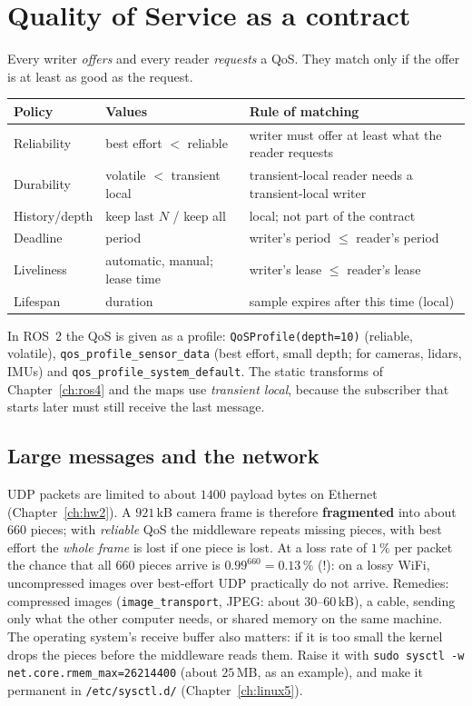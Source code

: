 \section*{Quality of Service as a contract}
Every writer \emph{offers} and every reader \emph{requests} a QoS. They match only if the offer is at least as good as the request.
\begin{center}
\renewcommand{\arraystretch}{1.25}
\begin{tabular}{p{2.6cm}p{4.2cm}p{5.8cm}}
\textbf{Policy} & \textbf{Values} & \textbf{Rule of matching}\\ \hline
Reliability & best effort $<$ reliable & writer must offer at least what the reader requests\\
Durability & volatile $<$ transient local & transient-local reader needs a transient-local writer\\
History/depth & keep last $N$ / keep all & local; not part of the contract\\
Deadline & period & writer's period $\le$ reader's period\\
Liveliness & automatic, manual; lease time & writer's lease $\le$ reader's lease\\
Lifespan & duration & sample expires after this time (local)\\
\end{tabular}
\end{center}
In ROS~2 the QoS is given as a profile: \verb!QoSProfile(depth=10)! (reliable, volatile), \verb!qos_profile_sensor_data! (best effort, small depth; for cameras, lidars, IMUs) and \verb!qos_profile_system_default!. The static transforms of Chapter~\ref{ch:ros4} and the maps use \emph{transient local}, because the subscriber that starts later must still receive the last message.

\subsection*{Large messages and the network}
UDP packets are limited to about $1400$ payload bytes on Ethernet (Chapter~\ref{ch:hw2}). A $921$\,kB camera frame is therefore \textbf{fragmented} into about $660$ pieces; with \emph{reliable} QoS the middleware repeats missing pieces, with best effort the \emph{whole frame} is lost if one piece is lost. At a loss rate of $1\,\%$ per packet the chance that all $660$ pieces arrive is $0.99^{660}=0.13\,\%$ (!): on a lossy WiFi, uncompressed images over best-effort UDP practically do not arrive. Remedies: compressed images (\verb!image_transport!, JPEG: about $30$--$60$\,kB), a cable, sending only what the other computer needs, or shared memory on the same machine. The operating system's receive buffer also matters: if it is too small the kernel drops the pieces before the middleware reads them. Raise it with \verb!sudo sysctl -w net.core.rmem_max=26214400! (about $25$\,MB, as an example), and make it permanent in \verb!/etc/sysctl.d/! (Chapter~\ref{ch:linux5}).

